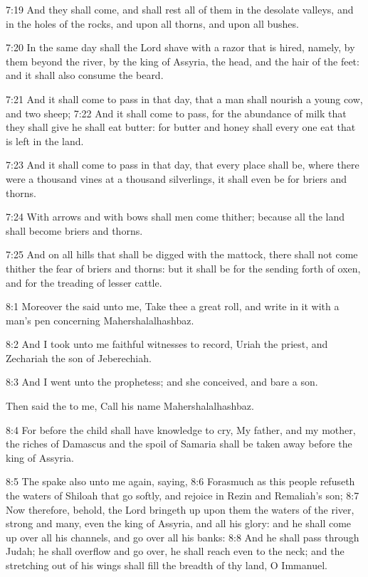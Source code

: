 7:19 And they shall come, and shall rest all of them in the desolate valleys, and in the holes of the rocks, and upon all thorns, and upon all bushes.

7:20 In the same day shall the Lord shave with a razor that is hired, namely, by them beyond the river, by the king of Assyria, the head, and the hair of the feet: and it shall also consume the beard.

7:21 And it shall come to pass in that day, that a man shall nourish a young cow, and two sheep; 7:22 And it shall come to pass, for the abundance of milk that they shall give he shall eat butter: for butter and honey shall every one eat that is left in the land.

7:23 And it shall come to pass in that day, that every place shall be, where there were a thousand vines at a thousand silverlings, it shall even be for briers and thorns.

7:24 With arrows and with bows shall men come thither; because all the land shall become briers and thorns.

7:25 And on all hills that shall be digged with the mattock, there shall not come thither the fear of briers and thorns: but it shall be for the sending forth of oxen, and for the treading of lesser cattle.

8:1 Moreover the \LORD said unto me, Take thee a great roll, and write in it with a man's pen concerning Mahershalalhashbaz.

8:2 And I took unto me faithful witnesses to record, Uriah the priest, and Zechariah the son of Jeberechiah.

8:3 And I went unto the prophetess; and she conceived, and bare a son.

Then said the \LORD to me, Call his name Mahershalalhashbaz.

8:4 For before the child shall have knowledge to cry, My father, and my mother, the riches of Damascus and the spoil of Samaria shall be taken away before the king of Assyria.

8:5 The \LORD spake also unto me again, saying, 8:6 Forasmuch as this people refuseth the waters of Shiloah that go softly, and rejoice in Rezin and Remaliah's son; 8:7 Now therefore, behold, the Lord bringeth up upon them the waters of the river, strong and many, even the king of Assyria, and all his glory: and he shall come up over all his channels, and go over all his banks: 8:8 And he shall pass through Judah; he shall overflow and go over, he shall reach even to the neck; and the stretching out of his wings shall fill the breadth of thy land, O Immanuel.

